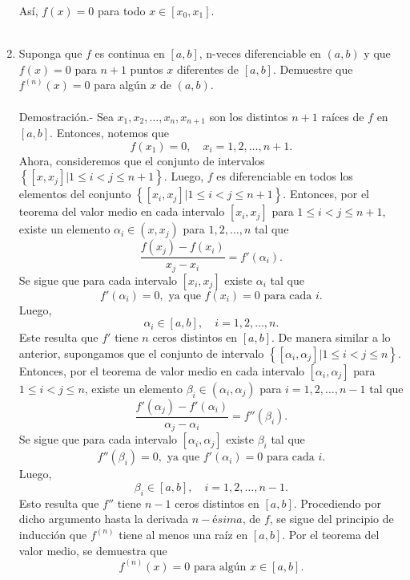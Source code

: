 \begin{enumerate}[\bfseries 1.]
\begin{enumerate}
    \end{enumerate}

    Así, $f(x)=0$ para todo $x\in [x_0,x_1]$.\\\\

    \item  Suponga que $f$ es continua en $[a,b]$, n-veces diferenciable en $(a,b)$ y que $f(x)=0$ para $n+1$ puntos $x$ diferentes de $[a,b]$. Demuestre que $f^{(n)} (x)=0$ para algún $x$ de $(a,b)$.\\\\
	Demostración.-\; Sea $x_1,x_2,\ldots,x_n,x_{n+1}$ son los distintos $n+1$ raíces de $f$ en $[a,b]$. Entonces, notemos que 
	$$f(x_1)=0,\quad x_i=1,2,\ldots,n+1.$$
	Ahora, consideremos que el conjunto de intervalos $\left\{[x,x_j]|1\leq i < j \leq n+1\right\}$. Luego, $f$ es diferenciable en todos los elementos del conjunto $\left\{[x_i,x_j] | 1\leq i < j \leq n+1\right\}$. Entonces, por el teorema del valor medio en cada intervalo $[x_i,x_j]$ para $1\leq i < j \leq n+1$, existe un elemento $\alpha_i\in (x,x_j)$ para $1,2,\ldots,n$ tal que
	$$\dfrac{f(x_j)-f(x_i)}{x_j-x_i}=f'(\alpha_i).$$
	Se sigue que para cada intervalo $[x_i,x_j]$ existe $\alpha_i$ tal que 
	$$f'(\alpha_i)=0,\mbox{ ya que } f(x_i)=0 \mbox{ para cada }i.$$
	Luego,
	$$\alpha_i\in [a,b],\quad i=1,2,\ldots,n.$$
	Este resulta que $f'$ tiene $n$ ceros distintos en $[a,b]$. De manera similar a lo anterior, supongamos que el conjunto de intervalo $\left\{[\alpha_i,\alpha_j]|1\leq i <j\leq n\right\}$. Entonces, por el teorema de valor medio en cada intervalo $[\alpha_i,\alpha_j]$ para $1\leq i <j\leq n$, existe un elemento $\beta_i\in(\alpha_i,\alpha_j)$ para $i=1,2,\ldots,n-1$ tal que 
	$$\dfrac{f'(\alpha_j)-f'(\alpha_i)}{\alpha_j-\alpha_i}=f''(\beta_i).$$
	Se sigue que para cada intervalo $[\alpha_i,\alpha_j]$ existe $\beta_i$ tal que
	$$f''(\beta_i)=0,\mbox{ ya que } f'(\alpha_i)=0 \mbox{ para cada }i.$$
	Luego,
	$$\beta_i\in [a,b],\quad i=1,2,\ldots,n-1.$$
	Esto resulta que $f''$ tiene $n-1$ ceros distintos en $[a,b]$. Procediendo por dicho argumento hasta la derivada $n-ésima$, de $f$, se sigue del principio de inducción que $f^{(n)}$ tiene al menos una raíz en $[a,b]$. Por el teorema del valor medio, se demuestra que
	$$f^{(n)}(x)=0\mbox{ para algún } x\in[a,b].$$\\


\end{enumerate}
